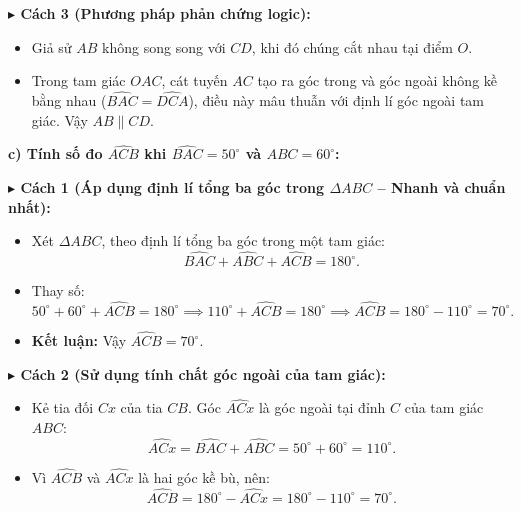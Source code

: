 \documentclass[12pt,a4paper]{article}
\begin{document}
\noindent\textbf{$\blacktriangleright$ Cách 3 (Phương pháp phản chứng logic):}
\begin{itemize}[leftmargin=16pt, itemsep=1.5pt, parsep=0pt]
  \item Giả sử $AB$ không song song với $CD$, khi đó chúng cắt nhau tại điểm $O$.
  \item Trong tam giác $OAC$, cát tuyến $AC$ tạo ra góc trong và góc ngoài không kề bằng nhau ($\widehat{BAC} = \widehat{DCA}$), điều này mâu thuẫn với định lí góc ngoài tam giác. Vậy $AB \parallel CD$.
\end{itemize}

\newpage

\noindent\textbf{c) Tính số đo $\widehat{ACB}$ khi $\widehat{BAC} = 50^\circ$ và $\widehat{ABC} = 60^\circ$:}

\vspace{1.5mm}
\noindent\textbf{$\blacktriangleright$ Cách 1 (Áp dụng định lí tổng ba góc trong $\Delta ABC$ -- Nhanh và chuẩn nhất):}
\begin{itemize}[leftmargin=16pt, itemsep=2pt, parsep=0pt]
  \item Xét $\Delta ABC$, theo định lí tổng ba góc trong một tam giác:
  \[
    \widehat{BAC} + \widehat{ABC} + \widehat{ACB} = 180^\circ.
  \]
  \item Thay số:
  \[
    50^\circ + 60^\circ + \widehat{ACB} = 180^\circ \implies 110^\circ + \widehat{ACB} = 180^\circ \implies \widehat{ACB} = 180^\circ - 110^\circ = 70^\circ.
  \]
  \item \textbf{Kết luận:} Vậy $\widehat{ACB} = 70^\circ$.
\end{itemize}

\vspace{1.5mm}
\noindent\textbf{$\blacktriangleright$ Cách 2 (Sử dụng tính chất góc ngoài của tam giác):}
\begin{itemize}[leftmargin=16pt, itemsep=2pt, parsep=0pt]
  \item Kẻ tia đối $Cx$ của tia $CB$. Góc $\widehat{ACx}$ là góc ngoài tại đỉnh $C$ của tam giác $ABC$:
  \[
    \widehat{ACx} = \widehat{BAC} + \widehat{ABC} = 50^\circ + 60^\circ = 110^\circ.
  \]
  \item Vì $\widehat{ACB}$ và $\widehat{ACx}$ là hai góc kề bù, nên:
  \[
    \widehat{ACB} = 180^\circ - \widehat{ACx} = 180^\circ - 110^\circ = 70^\circ.
  \]
\end{itemize}
\end{document}
